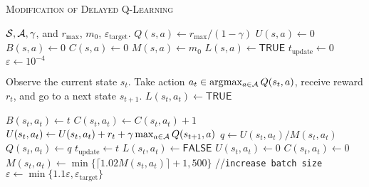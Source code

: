 \renewcommand{\algorithmiccomment}[1]{\hfill\eqparbox{COMMENT}{// #1}}

\begin{algorithm}[h!]
\small
   \caption{\textsc{Modification of Delayed Q-Learning}\cite{talebi2017modified}}
   \label{alg:alg1}
\begin{algorithmic}
   \REQUIRE ${\mathcal S}, {\mathcal A},\gamma$, and $r_{\max}$, $m_0$, $\varepsilon_{\mathrm{target}}$. 
    \STATE $Q(s, a) \leftarrow r_{\max}/(1-\gamma)$ {\color{blue}  } 
    \STATE $U(s,a) \leftarrow 0$    {\color{blue} }
    \STATE $B(s, a) \leftarrow 0$   {\color{blue}  }
    \STATE $C(s,a) \leftarrow 0$    {\color{blue}  } 
    \STATE $M(s, a) \leftarrow m_0$          {\color{blue}  }  
    \STATE $L(s,a)\leftarrow \textsf{TRUE} $   {\color{blue} } 
   \ENDFOR
   \STATE $t_{\textrm{update}} \leftarrow 0$  {\color{blue}  }
   \STATE $\varepsilon \leftarrow 10^{-4}$    {\color{blue}  }
   
    \STATE Observe the current state $s_t$. Take action $a_t \in \arg\!\max_{a\in {\mathcal A}} Q(s_t, a)$, receive reward $r_t$, and go to a next state $s_{t+1}$.    \alsp
     \alsp
        \STATE $L(s_t,a_t) \leftarrow \textsf{TRUE}$ \alsp
    \ENDIF
    
     \alsp
         \alsp
            \STATE $B(s_t,a_t)\leftarrow t$ \alsp
        \ENDIF
        \STATE $C(s_t,a_t) \leftarrow C(s_t,a_t) + 1$ \alsp
        \STATE $U(s_t, a_t) \leftarrow U(s_t, a_t) + r_t + \gamma \max_{a\in {\mathcal A}} Q(s_{t+1}, a)$   \alsp
         \alsp
            \STATE $q \leftarrow U(s_t, a_t)/M(s_t,a_t)$ \alsp
             \alsp
                \STATE $Q(s_t,a_t) \leftarrow q$ 
                \STATE $t_{\textrm{update}} \leftarrow t$ \alsp
             \alsp
                \STATE $L(s_t,a_t) \leftarrow \textsf{FALSE}$ \alsp
            \ENDIF
            \STATE $U(s_t,a_t) \leftarrow 0$ \alsp
            \STATE $C(s_t, a_t) \leftarrow 0$ \alsp
            \STATE $M(s_t, a_t) \leftarrow \min\{\lceil 1.02M(s_t,a_t)\rceil +1, 500\}$  {\color{blue} \alsp //{\texttt{increase batch size}}}
            \STATE $\varepsilon \leftarrow \min \{1.1\varepsilon, \varepsilon_{\mathrm{target}}\}$   {\color{blue}  }
        \ENDIF
    \ENDIF
   \ENDFOR             

\end{algorithmic}
\end{algorithm}

